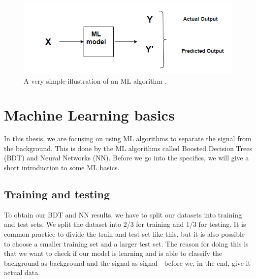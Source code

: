 \begin{figure}[H]
    \centering
    \includegraphics[width = \textwidth]{Figures/FromOnline/MLex.png}
    \caption{A very simple illustration of an ML algorithm \cite{MLex}.}
    \label{fig:MLex}
\end{figure}

\section{Machine Learning basics}
In this thesis, we are focusing on using ML algorithms to separate the signal from the background. This is done by the ML algorithms called Boosted Decision Trees (BDT) and Neural Networks (NN). Before we go into the specifics, we will give a short introduction to some ML basics.

\subsection{Training and testing}
\label{sec:TandT}
To obtain our BDT and NN results, we have to split our datasets into training and test sets. We split the dataset into 2/3 for training and 1/3 for testing. It is common practice to divide the train and test set like this, but it is also possible to choose a smaller training set and a larger test set. The reason for doing this is that we want to check if our model is learning and is able to classify the background as background and the signal as signal - before we, in the end, give it actual data. 

